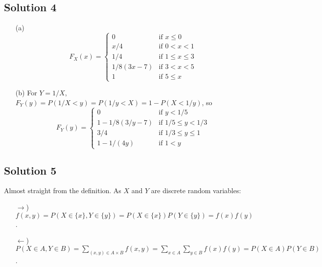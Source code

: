 \subsection*{Solution 4}

\begin{itemize}
    \item[(a)]
        \begin{equation*}
            F_X(x) = \left\{ \begin{array}{ll}
                0 & \text{if } x \leq 0 \\
                x/4 & \text{if } 0 < x < 1 \\
                1/4 & \text{if } 1 \leq x \leq 3 \\
                1/8(3x - 7) & \text{if } 3 < x < 5 \\
                1 & \text{if } 5 \leq x
            \end{array} \right.
        \end{equation*}
    \item[(b)] For $Y = 1/X$, $F_Y(y) = P(1/X < y) = P(1/y < X) = 1 - P(X < 1/y)$, so
        \begin{equation*}
            F_Y(y) = \left\{ \begin{array}{ll}
                0 & \text{if } y < 1/5 \\
                1 - 1/8(3/y - 7) & \text{if } 1/5 \leq y < 1/3 \\
                3/4 & \text{if } 1/3 \leq y \leq 1 \\
                1 - 1/(4y) & \text{if } 1 < y
            \end{array} \right.
        \end{equation*}
\end{itemize}


\subsection*{Solution 5}

Almost straight from the definition.
As $X$ and $Y$ are discrete random variables:
\begin{itemize}
\item[$\rightarrow$)] $f(x, y) = P(X \in \{x\}, Y \in \{y\}) = P(X \in \{x\})P(Y \in \{y\}) = f(x)f(y)$.
\item[$\leftarrow$)] $P(X \in A, Y \in B) = \sum_{(x, y) \in A \times B} f(x, y) = \sum_{x \in A} \sum_{y \in B} f(x) f(y) = P(X \in A) P(Y \in B)$.
\end{itemize}


